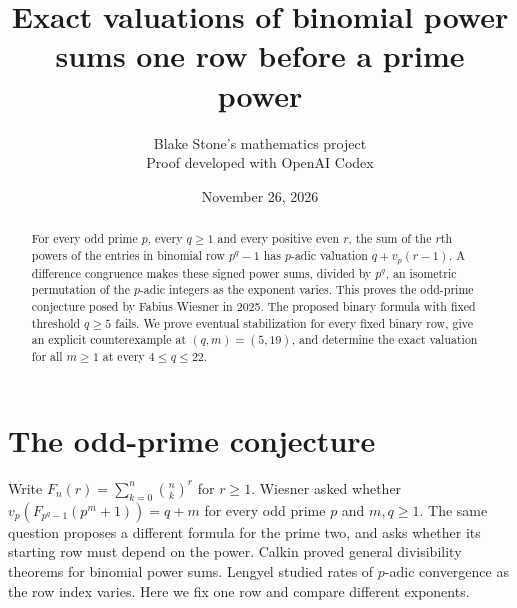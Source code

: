 \documentclass[11pt]{article}
\title{Exact valuations of binomial power sums one row before a prime power}
\author{Blake Stone's mathematics project\\\small Proof developed with OpenAI Codex}
\date{November 26, 2026}
\begin{document}
\maketitle
\begin{abstract}
For every odd prime $p$, every $q\ge1$ and every positive even $r$, the sum of the $r$th powers of the entries in binomial row $p^q-1$ has $p$-adic valuation $q+v_p(r-1)$. A difference congruence makes these signed power sums, divided by $p^q$, an isometric permutation of the $p$-adic integers as the exponent varies. This proves the odd-prime conjecture posed by Fabius Wiesner in 2025. The proposed binary formula with fixed threshold $q\ge5$ fails. We prove eventual stabilization for every fixed binary row, give an explicit counterexample at $(q,m)=(5,19)$, and determine the exact valuation for all $m\ge1$ at every $4\le q\le22$.
\end{abstract}

\section{The odd-prime conjecture}
Write $F_n(r)=\sum_{k=0}^n\binom nk^r$ for $r\ge1$. Wiesner \cite{question} asked whether $v_p(F_{p^q-1}(p^m+1))=q+m$ for every odd prime $p$ and $m,q\ge1$. The same question proposes a different formula for the prime two, and asks whether its starting row must depend on the power. Calkin \cite{calkin} proved general divisibility theorems for binomial power sums. Lengyel \cite{lengyel} studied rates of $p$-adic convergence as the row index varies. Here we fix one row and compare different exponents.
\end{document}
